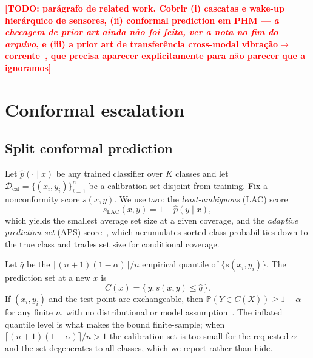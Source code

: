 \documentclass{article}
\newcommand{\TODO}[1]{\textcolor{red}{\textbf{[TODO: #1]}}}
\begin{document}
\TODO{parágrafo de related work. Cobrir (i) cascatas e wake-up hierárquico
de sensores, (ii) conformal prediction em PHM --- \emph{a checagem de prior
art ainda não foi feita, ver a nota no fim do arquivo}, e (iii) a prior art
de transferência cross-modal vibração$\rightarrow$corrente~\cite{momd},
que precisa aparecer explicitamente para não parecer que a ignoramos}

\section{Conformal escalation}

\subsection{Split conformal prediction}
Let $\hat p(\cdot \mid x)$ be any trained classifier over $K$ classes and
let $\mathcal{D}_{\mathrm{cal}} = \{(x_i,y_i)\}_{i=1}^{n}$ be a calibration
set disjoint from training. Fix a nonconformity score $s(x,y)$. We use two:
the \emph{least-ambiguous} (LAC) score~\cite{sadinle2019}
\begin{equation}
s_{\mathrm{LAC}}(x,y) = 1 - \hat p(y \mid x),
\end{equation}
which yields the smallest average set size at a given coverage, and the
\emph{adaptive prediction set} (APS) score~\cite{romano2020}, which
accumulates sorted class probabilities down to the true class and trades
set size for conditional coverage.

Let $\hat q$ be the $\lceil (n+1)(1-\alpha) \rceil / n$ empirical quantile
of $\{s(x_i,y_i)\}$. The prediction set at a new $x$ is
\begin{equation}
C(x) = \{\, y : s(x,y) \leq \hat q \,\}.
\label{eq:set}
\end{equation}
If $(x_i,y_i)$ and the test point are exchangeable, then
$\mathbb{P}(Y \in C(X)) \geq 1-\alpha$ for any finite $n$, with no
distributional or model assumption~\cite{vovk2005,lei2018}. The inflated
quantile level is what makes the bound finite-sample; when
$\lceil (n+1)(1-\alpha)\rceil / n > 1$ the calibration set is too small for
the requested $\alpha$ and the set degenerates to all classes, which we
report rather than hide.
\end{document}
